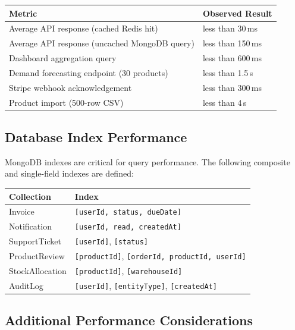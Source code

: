 \documentclass[12pt,a4paper]{report}
\begin{document}
\begin{center}
\begin{tabular}{p{}p{}}
    \toprule
    \textbf{Metric} & \textbf{Observed Result} \\
    \midrule
    Average API response (cached Redis hit) & less than 30\,ms \\
    Average API response (uncached MongoDB query) & less than 150\,ms \\
    Dashboard aggregation query & less than 600\,ms \\
    Demand forecasting endpoint (30 products) & less than 1.5\,s \\
    Stripe webhook acknowledgement & less than 300\,ms \\
    Product import (500-row CSV) & less than 4\,s \\
    \bottomrule
\end{tabular}
\end{center}

\subsection{Database Index Performance}

MongoDB indexes are critical for query performance. The following composite and single-field indexes are defined:

\begin{center}
\begin{tabular}{p{}p{}}
    \toprule
    \textbf{Collection} & \textbf{Index} \\
    \midrule
    Invoice & \texttt{[userId, status, dueDate]} \\
    Notification & \texttt{[userId, read, createdAt]} \\
    SupportTicket & \texttt{[userId]}, \texttt{[status]} \\
    ProductReview & \texttt{[productId]}, \texttt{[orderId, productId, userId]} \\
    StockAllocation & \texttt{[productId]}, \texttt{[warehouseId]} \\
    AuditLog & \texttt{[userId]}, \texttt{[entityType]}, \texttt{[createdAt]} \\
    \bottomrule
\end{tabular}
\end{center}

\subsection{Additional Performance Considerations}
\end{document}
